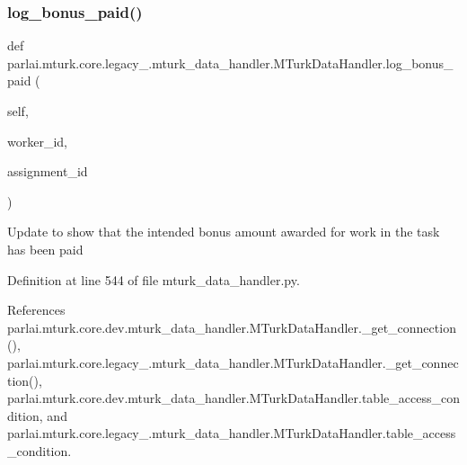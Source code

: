 \subsubsection{\texorpdfstring{log\+\_\+bonus\+\_\+paid()}{log\_bonus\_paid()}}
{\footnotesize\ttfamily def parlai.\+mturk.\+core.\+legacy\+\_.\+mturk\+\_\+data\+\_\+handler.\+M\+Turk\+Data\+Handler.\+log\+\_\+bonus\+\_\+paid (\begin{DoxyParamCaption}\item[{}]{self,  }\item[{}]{worker\+\_\+id,  }\item[{}]{assignment\+\_\+id }\end{DoxyParamCaption})}

\begin{DoxyVerb}Update to show that the intended bonus amount awarded for work
in the task has been paid
\end{DoxyVerb}
 

Definition at line 544 of file mturk\+\_\+data\+\_\+handler.\+py.



References parlai.\+mturk.\+core.\+dev.\+mturk\+\_\+data\+\_\+handler.\+M\+Turk\+Data\+Handler.\+\_\+get\+\_\+connection(), parlai.\+mturk.\+core.\+legacy\+\_.\+mturk\+\_\+data\+\_\+handler.\+M\+Turk\+Data\+Handler.\+\_\+get\+\_\+connection(), parlai.\+mturk.\+core.\+dev.\+mturk\+\_\+data\+\_\+handler.\+M\+Turk\+Data\+Handler.\+table\+\_\+access\+\_\+condition, and parlai.\+mturk.\+core.\+legacy\+\_.\+mturk\+\_\+data\+\_\+handler.\+M\+Turk\+Data\+Handler.\+table\+\_\+access\+\_\+condition.

